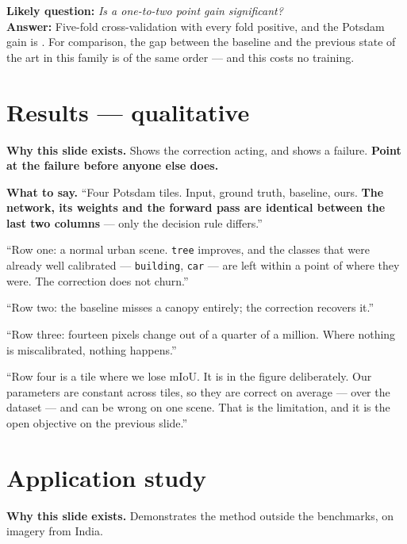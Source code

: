 \documentclass[11pt,a4paper]{article}
\newcommand{\best}[1]{\textcolor{acc}{\textbf{#1}}}
\newcommand{\bad}[1]{\textcolor{warn}{#1}}
\newcommand{\why}[1]{\par\smallskip\noindent\textbf{Why this slide exists.} #1}
\newcommand{\say}[1]{\par\smallskip\noindent\textbf{What to say.} #1}
\newcommand{\ask}[2]{\par\smallskip\noindent\textbf{Likely question:} \emph{#1}\\
  \textbf{Answer:} #2}
\begin{document}
\ask{Is a one-to-two point gain significant?}{Five-fold cross-validation with
every fold positive, and the Potsdam gain is \potsTotal{}. For comparison, the
gap between the baseline and the previous state of the art in this family is of
the same order --- and this costs no training.}

\section{Results --- qualitative}
\why{Shows the correction acting, and shows a failure. \best{Point at the failure
before anyone else does.}}

\say{``Four Potsdam tiles. Input, ground truth, baseline, ours. \best{The network,
its weights and the forward pass are identical between the last two columns} ---
only the decision rule differs.''

\smallskip
``Row one: a normal urban scene. \texttt{tree} improves, and the classes that
were already well calibrated --- \texttt{building}, \texttt{car} --- are left
within a point of where they were. The correction does not churn.''

\smallskip
``Row two: the baseline misses a canopy entirely; the correction recovers it.''

\smallskip
``Row three: fourteen pixels change out of a quarter of a million. Where nothing
is miscalibrated, nothing happens.''

\smallskip
``\bad{Row four is a tile where we lose \qualLoss{} mIoU.} It is in the figure
deliberately. Our parameters are constant across tiles, so they are correct on
average --- \potsTotal{} over the dataset --- and can be wrong on one scene. That
is the limitation, and it is the open objective on the previous slide.''}

\section{Application study}
\why{Demonstrates the method outside the benchmarks, on imagery from India.}
\end{document}
